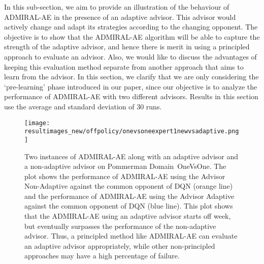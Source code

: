 \documentclass[jair, twoside,11pt,theapa]{article}
\begin{document}
In this sub-section, we aim to provide an illustration of the behaviour of ADMIRAL-AE in the presence of an adaptive advisor. This advisor would actively change and adapt its strategies according to the changing opponent. The objective is to show that the ADMIRAL-AE algorithm will be able to capture the strength of the adaptive advisor, and hence there is merit in using a principled approach to evaluate an advisor. Also, we would like to discuss the advantages of keeping this evaluation method separate from another approach that aims to learn from the advisor. In this section, we clarify that we are only considering the `pre-learning' phase introduced in our paper, since our objective is to analyze the performance of ADMIRAL-AE with two different advisors. Results in this section use the average and standard deviation of 30 runs. 


\begin{figure}[h]
    \centering
    \texttt{[image: resultimages\_new/offpolicy/onevsoneexpert1newvsadaptive.png]}
    \caption{Two instances of ADMIRAL-AE along with an adaptive advisor and a non-adaptive advisor on Pommerman Domain~OneVsOne. The plot shows the performance of ADMIRAL-AE using the Advisor Non-Adaptive against the common opponent of DQN (orange line) and the performance of ADMIRAL-AE using the Advisor Adaptive against the common opponent of DQN (blue line). This plot shows that the ADMIRAL-AE using an adaptive advisor starts off week, but eventually surpasses the performance of the non-adaptive advisor. Thus, a principled method like ADMIRAL-AE can evaluate an adaptive advisor appropriately, while other non-principled approaches may have a high percentage of failure.}
    \label{fig:adaptiveadvisor}
\end{figure}

 
\end{document}
